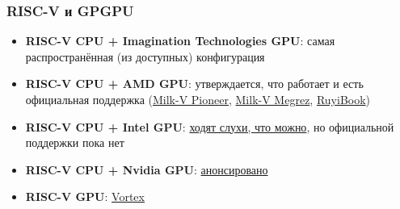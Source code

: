 \documentclass[xcolor=table,aspectratio=169]{beamer}
\begin{document}
\begin{frame}[fragile]
  \frametitle{RISC-V и GPGPU}
  \begin{itemize}
    \item \textbf{RISC-V CPU + Imagination Technologies GPU}: самая распространённая (из доступных) конфигурация
    \item \textbf{RISC-V CPU + AMD GPU}: утверждается, что работает и есть официальная поддержка (\href{https://milkv.io/pioneer}{Milk-V Pioneer}, \href{https://riscv.org/ecosystem-news/2024/10/risc-v-cpu-demoed-with-rx-7900-xtx-gpu-in-debian-linux-amd-flagship-gpu-paired-with-milk-v-megrez-board-and-sifive-p550-cores/}{Milk-V Megrez}, \href{https://milkv.io/ruyibook}{RuyiBook})
    \item \textbf{RISC-V CPU + Intel GPU}: \href{https://www.reddit.com/r/RISCV/comments/1ftep9u/intel_arc_a770_on_riscv/}{ходят слухи, что можно}, но официальной поддержки пока нет
    \item \textbf{RISC-V CPU + Nvidia GPU}: \href{https://riscv.org/ecosystem-news/2025/07/nvidia-to-bring-cuda-platform-support-to-the-risc-v/}{анонсировано}
    \item \textbf{RISC-V GPU}: \href{https://github.com/vortexgpgpu/vortex}{Vortex}
  \end{itemize}
\end{frame}
\end{document}
